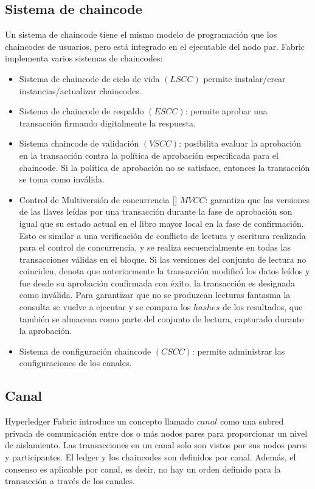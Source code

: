 \subsection{Sistema de chaincode}
Un sistema de chaincode tiene el mismo modelo de programaci\'on que los chaincodes de usuarios, pero est\'a integrado en el ejecutable del nodo par. Fabric implementa varios sistemas de chaincodes:
\begin{itemize}
\item Sistema de chaincode de ciclo de vida $(LSCC)$ permite instalar/crear instancias/actualizar chaincodes.

\item Sistema de chaincode de respaldo $(ESCC)$: permite aprobar una transacci\'on firmando digitalmente la respuesta.

\item Sistema chaincode de validaci\'on $(VSCC)$: posibilita evaluar la aprobaci\'on en la transacci\'on contra la pol\'itica de aprobaci\'on especificada para el chaincode. Si la pol\'itica de aprobaci\'on no se satisface, entonces la transacci\'on se toma como inv\'alida.

\item Control de Multiversi\'on de concurrencia [\cite{papadimitriou1984concurrency}] $MVCC$: garantiza que las versiones de las llaves le\'idas por una transacci\'on durante la fase de aprobaci\'on son igual que su estado actual en el libro mayor local en la fase de confirmaci\'on. Esto es similar a una verificaci\'on de conflicto de lectura y escritura realizada para el control de concurrencia, y se realiza secuencialmente en todas las transacciones v\'alidas en el bloque. Si las versiones del conjunto de lectura no coinciden, denota que anteriormente la transacci\'on modific\'o los datos le\'idos y fue desde su aprobaci\'on confirmada con \'exito, la transacci\'on es designada como inv\'alida. Para garantizar que no se produzcan lecturas fantasma la consulta se vuelve a ejecutar y se compara los $hashes$ de los resultados, que tambi\'en se almacena como parte del conjunto de lectura, capturado durante la aprobaci\'on.

\item Sistema de configuraci\'on chaincode $(CSCC)$: permite administrar las configuraciones de los canales.
\end{itemize}


\subsection{Canal}
Hyperledger Fabric introduce un concepto llamado $canal$ como una subred privada de comunicaci\'on entre dos o m\'as nodos pares para proporcionar un nivel de aislamiento. Las transacciones en un canal solo son vistos por sus nodos pares y participantes. El ledger y los chaincodes son definidos por canal. Adem\'as, el consenso es aplicable por canal, es decir, no hay un orden definido para la transacci\'on a trav\'es de los canales.

